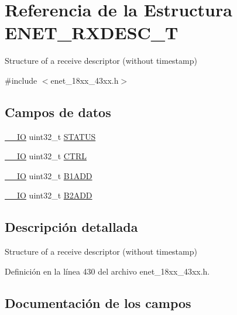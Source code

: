 \hypertarget{struct_e_n_e_t___r_x_d_e_s_c___t}{}\section{Referencia de la Estructura E\+N\+E\+T\+\_\+\+R\+X\+D\+E\+S\+C\+\_\+T}
\label{struct_e_n_e_t___r_x_d_e_s_c___t}


Structure of a receive descriptor (without timestamp)  




{\ttfamily \#include $<$enet\+\_\+18xx\+\_\+43xx.\+h$>$}

\subsection*{Campos de datos}
\begin{DoxyCompactItemize}
\item 
\hyperlink{core__sc300_8h_aec43007d9998a0a0e01faede4133d6be}{\+\_\+\+\_\+\+IO} uint32\+\_\+t \hyperlink{struct_e_n_e_t___r_x_d_e_s_c___t_a0b3f4c41f87ca52c3b6bca0bafa0df6b}{S\+T\+A\+T\+US}
\item 
\hyperlink{core__sc300_8h_aec43007d9998a0a0e01faede4133d6be}{\+\_\+\+\_\+\+IO} uint32\+\_\+t \hyperlink{struct_e_n_e_t___r_x_d_e_s_c___t_a15fc8d35f045f329b80c544bef35ff64}{C\+T\+RL}
\item 
\hyperlink{core__sc300_8h_aec43007d9998a0a0e01faede4133d6be}{\+\_\+\+\_\+\+IO} uint32\+\_\+t \hyperlink{struct_e_n_e_t___r_x_d_e_s_c___t_a9b99a80d13d854bce5c3f9646964c34e}{B1\+A\+DD}
\item 
\hyperlink{core__sc300_8h_aec43007d9998a0a0e01faede4133d6be}{\+\_\+\+\_\+\+IO} uint32\+\_\+t \hyperlink{struct_e_n_e_t___r_x_d_e_s_c___t_a3cf5d995cea5c3b42b9224871c5b18a1}{B2\+A\+DD}
\end{DoxyCompactItemize}


\subsection{Descripción detallada}
Structure of a receive descriptor (without timestamp) 

Definición en la línea 430 del archivo enet\+\_\+18xx\+\_\+43xx.\+h.



\subsection{Documentación de los campos}
